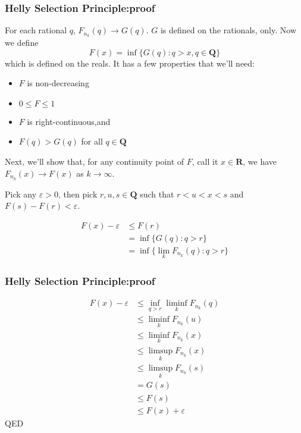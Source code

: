 \documentclass[handout]{beamer}
\begin{document}
\frame
{
\frametitle{Helly Selection Principle:proof} 

For each rational $q$, $F_{n_k}(q) \to  G(q)$. $G$ is defined on the rationals, only. Now we define 
$$
F(x) = \inf\{ G(q) : q > x, q \in \mathbf{Q} \}
$$
which is defined on the reals. It has a few properties that we'll need:

\begin{itemize}
\item $F$ is non-decreasing
\item $0 \le F \le 1$
\item $F$ is right-continuous,and
\item $F(q) > G(q)$ for all $q \in \mathbf{Q}$
\end{itemize}

Next, we'll show that, for any continuity point of $F$, call it $x \in \mathbf{R}$, we have $F_{n_k}(x) \to F(x)$ as $k \to \infty$. 

Pick any $\varepsilon > 0$, then pick $r,u,s \in \mathbf{Q}$ such that $r < u < x < s$ and $F(s) - F(r) < \varepsilon$.

\begin{align*}
F(x) - \varepsilon &\le F(r) \\
&= \inf\{ G(q) : q > r\} \\
&= \inf\{ \lim_{k} F_{n_k}(q) : q > r\} 
\end{align*}
}


\frame
{
\frametitle{Helly Selection Principle:proof} 


\begin{align*}
F(x) - \varepsilon &\le \inf_{q > r} \liminf_{k} F_{n_k}(q) \\
&\le \liminf_{k} F_{n_k}(u) \tag{$u > r$} \\
&\le \liminf_{k} F_{n_k}(x) \tag{$x > u$ } \\
&\le \limsup_{k} F_{n_k}(x)  \\
&\le \limsup_{k} F_{n_k}(s) \tag{$s > x$ } \\
&= G(s) \\
&\le F(s) \\
&\le F(x) + \varepsilon 
\end{align*}
QED
}
\end{document}
